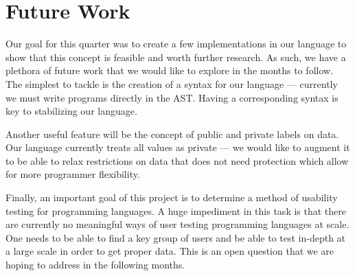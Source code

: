 \section{Future Work}
\label{sec:future}

Our goal for this quarter was to create a few implementations in our language to
show that this concept is feasible and worth further research. As such, we have
a plethora of future work that we would like to explore in the months to follow.
The simplest to tackle is the creation of a syntax for our language ---
currently we must write programs directly in the AST. Having a corresponding
syntax is key to stabilizing our language.

Another useful feature will be the concept of public and private labels on data.
Our language currently treats all values as private --- we would like to augment
it to be able to relax restrictions on data that does not need protection which allow for more programmer flexibility.

Finally, an important goal of this project is to determine a method of usability
testing for programming languages. A huge impediment in this task is that there
are currently no meaningful ways of user testing programming languages at scale.
One needs to be able to find a key group of users and be able to test in-depth
at a large scale in order to get proper data. This is an open question that we
are hoping to address in the following months.
